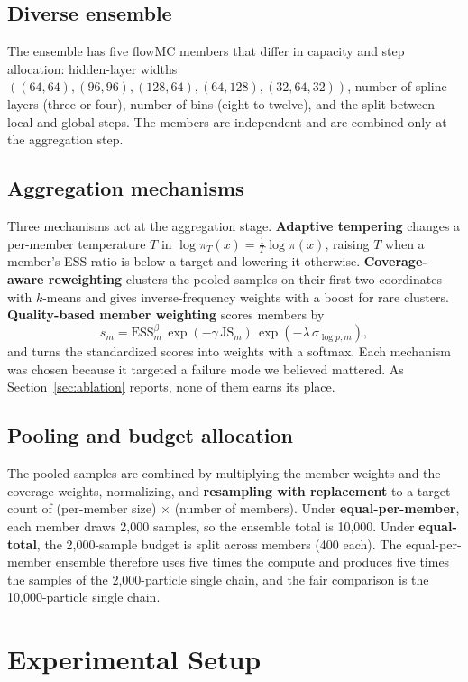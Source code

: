 \documentclass[11pt]{article}
\begin{document}
\subsection{Diverse ensemble}
The ensemble has five flowMC members that differ in capacity and step
allocation: hidden-layer widths $((64,64),(96,96),(128,64),(64,128),(32,64,32))$,
number of spline layers (three or four), number of bins (eight to twelve), and
the split between local and global steps. The members are independent and are
combined only at the aggregation step.

\subsection{Aggregation mechanisms}
Three mechanisms act at the aggregation stage. \textbf{Adaptive tempering}
changes a per-member temperature $T$ in
$\log\pi_T(x)=\tfrac{1}{T}\log\pi(x)$, raising $T$ when a member's ESS ratio is
below a target and lowering it otherwise. \textbf{Coverage-aware reweighting}
clusters the pooled samples on their first two coordinates with $k$-means and
gives inverse-frequency weights with a boost for rare clusters.
\textbf{Quality-based member weighting} scores members by
\begin{equation}
s_m=\mathrm{ESS}_m^{\beta}\,\exp(-\gamma\,\mathrm{JS}_m)\,
\exp(-\lambda\,\sigma_{\log p,m}),
\end{equation}
and turns the standardized scores into weights with a softmax. Each mechanism
was chosen because it targeted a failure mode we believed mattered. As
Section~\ref{sec:ablation} reports, none of them earns its place.

\subsection{Pooling and budget allocation}
The pooled samples are combined by multiplying the member weights and the
coverage weights, normalizing, and \textbf{resampling with replacement} to a
target count of (per-member size) $\times$ (number of members). Under
\textbf{equal-per-member}, each member draws 2,000 samples, so the ensemble
total is 10,000. Under \textbf{equal-total}, the 2,000-sample budget is split
across members (400 each). The equal-per-member ensemble therefore uses five
times the compute and produces five times the samples of the 2,000-particle
single chain, and the fair comparison is the 10,000-particle single chain.

\section{Experimental Setup}
\end{document}
